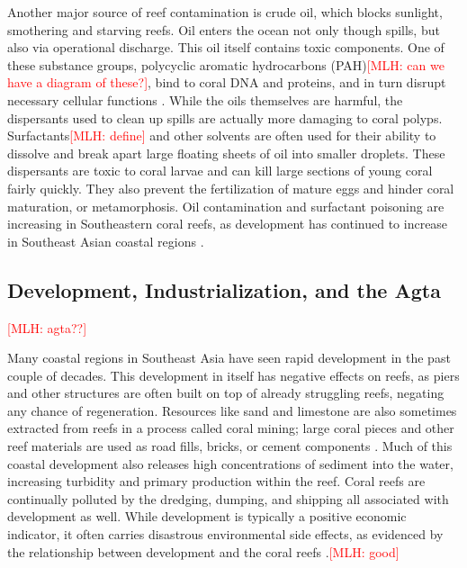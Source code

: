 \documentclass{book}\usepackage{knitr}
\newcommand{\red}[1]{\textcolor{red}{[MLH: #1]}}
\begin{document}
{Another major source of reef contamination is crude oil, which blocks sunlight, smothering and starving reefs. Oil enters the ocean not only though spills, but also via operational discharge. This oil itself contains toxic components. One of these substance groups, polycyclic aromatic hydrocarbons (PAH)\red{can we have a diagram of these?}, bind to coral DNA and proteins, and in turn disrupt necessary cellular functions \citep{4884777420100401}. While the oils themselves are harmful, the dispersants used to clean up spills are actually more damaging to coral polyps. Surfactants\red{define} and other solvents are often used for their ability to dissolve and break apart large floating sheets of oil into smaller droplets. These dispersants are toxic to coral larvae and can kill large sections of young coral fairly quickly. They also prevent the fertilization of mature eggs and hinder coral maturation, or metamorphosis. Oil contamination and surfactant poisoning are increasing in Southeastern coral reefs, as development has continued to increase in Southeast Asian coastal regions \citep{2615280620070801}.

\subsection{Development, Industrialization, and the Agta}\red{agta??}

Many coastal regions in Southeast Asia have seen rapid development in the past couple of decades. This development in itself has negative effects on reefs, as piers and other structures are often built on top of already struggling reefs, negating any chance of regeneration. Resources like sand and limestone are also sometimes extracted from reefs in a process called coral mining; large coral pieces and other reef materials are used as road fills, bricks, or cement components \citep{coralreefalliance_2021}. Much of this coastal development also releases high concentrations of sediment into the water, increasing turbidity and primary production within the reef. Coral reefs are continually polluted by the dredging, dumping, and shipping all associated with development as well. While development is typically a positive economic indicator, it often carries disastrous environmental side effects, as evidenced by the relationship between development and the coral reefs \citep{USEPA_2017}.\red{good}

}
\end{document}
